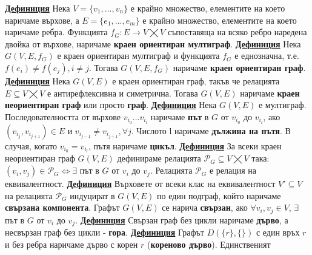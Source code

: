 \documentclass{article}
\begin{document}
\textbf{\underline{Дефиниция}}
Нека $V = \{v_1, ..., v_n\}$ е крайно множество, елементите на което наричаме върхове, а $E = \{e_1, ..., e_m\}$
е крайно множество, елементите на което наричаме ребра. Функцията $f_G : E \rightarrow V \bigtimes V$ съпоставяща
на всяко ребро наредена двойка от върхове, наричаме \textbf{краен ориентиран мултиграф}. \newline\newline
\textbf{\underline{Дефиниция}}
Нека $G(V, E, f_G)$ е краен ориентиран мултиграф и функцията $f_G$ е еднозначна, т.е. $f(e_i) \neq f(e_j), i \neq j$.
Тогава $G(V, E, f_G)$ наричаме \textbf{краен ориентиран граф}. \newline\newline
\textbf{\underline{Дефиниция}}
Нека $G(V, E)$ е краен ориентиран граф, такъв че релацията $E \subseteq V \bigtimes V$ е антирефлексивна и 
симетрична. Тогава $G(V, E)$ наричаме \textbf{краен неориентиран граф} или просто \textbf{граф}. \newline\newline
\textbf{\underline{Дефиниция}}
Нека $G(V, E)$ е мултиграф. Последователността от върхове $v_{i_0}...v_{i_l}$ наричаме \textbf{път} в $G$ от $v_{i_0}$ до
$v_{i_l}$, ако $(v_{i_j}, v_{i_{j + 1}}) \in E$ и $v_{i_{j - 1}} \neq v_{i_{j + 1}}, \forall j$. Числото l наричаме
\textbf{дължина на пътя}. В случая, когато $v_{i_0} = v_{i_l}$, пътя наричаме \textbf{цикъл}. \newline\newline
\textbf{\underline{Дефиниция}}
За всеки краен неориентиран граф $G(V, E)$ дефинираме релацията $\mathcal{P}_G \subseteq V \bigtimes V$ така: $(v_i, v_j) \in
\mathcal{P}_G \iff \exists$ път в $G$ от $v_i$ до $v_j$. Релацията $\mathcal{P}_G$ е релация на еквивалентност. \newline\newline
\textbf{\underline{Дефиниция}}
Върховете от всеки клас на еквивалентност $V' \subseteq V$ на релацията $\mathcal{P}_G$ индуцират в $G(V, E)$ по един подграф,
който наричаме \textbf{свързана компонента}. Графът $G(V, E)$ се нарича \textbf{свързан}, ако $\forall v_i, v_j \in V$, $\exists$
път в $G$ от $v_i$ до $v_j$. \newline\newline
\textbf{\underline{Дефиниция}}
Свързан граф без цикли наричаме \textbf{дърво}, а несвързан граф без цикли - \textbf{гора}. \newline\newline
\textbf{\underline{Дефиниция}}
Графът $D(\{r\}, \{\})$ с един връх $r$ и без ребра наричаме дърво с корен $r$ (\textbf{кореново дърво}). Единственият
\end{document}
